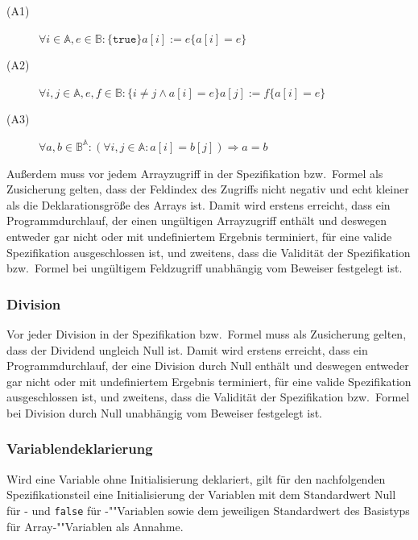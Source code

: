 \begin{description}%
    \item[(A1)] \begin{math}\forall i \in \mathbb{A}, e \in \mathbb{B} : \{\texttt{true}\} a[i] := e \{a[i] = e\}\end{math}%
    \item[(A2)] \begin{math}\forall i, j \in \mathbb{A}, e, f \in \mathbb{B} : \{i \neq j \wedge a[i] = e\} a[j] := f \{a[i] = e\}\end{math}%
    \item[(A3)] \begin{math}\forall a, b \in \mathbb{B}^\mathbb{A} : (\forall i, j \in \mathbb{A} : a[i] = b[j]) \Rightarrow a = b\end{math}%
\end{description}%

Außerdem muss vor jedem Arrayzugriff in der Spezifikation bzw.\ Formel
als Zusicherung gelten, dass der Feldindex des Zugriffs nicht negativ
und echt kleiner als die Deklarationsgröße des Arrays ist. Damit wird
erstens erreicht, dass ein Programmdurchlauf, der einen ungültigen
Arrayzugriff enthält und deswegen entweder gar nicht oder mit
undefiniertem Ergebnis terminiert, für eine valide Spezifikation
ausgeschlossen ist, und zweitens, dass die Validität der Spezifikation
bzw.\ Formel bei ungültigem Feldzugriff unabhängig vom Beweiser
festgelegt ist.%

\subsubsection{Division}%

Vor jeder Division in der Spezifikation bzw.\ Formel muss als
Zusicherung gelten, dass der Dividend ungleich Null ist. Damit wird
erstens erreicht, dass ein Programmdurchlauf, der eine Division durch
Null enthält und deswegen entweder gar nicht oder mit undefiniertem
Ergebnis terminiert, für eine valide Spezifikation ausgeschlossen ist,
und zweitens, dass die Validität der Spezifikation bzw.\ Formel bei
Division durch Null unabhängig vom Beweiser festgelegt ist.%

\subsubsection{Variablendeklarierung}%

Wird eine Variable ohne Initialisierung deklariert, gilt für den
nachfolgenden Spezifikationsteil eine Initialisierung der Variablen
mit dem Standardwert Null für \int- und \texttt{false} für
\bool-""Variablen sowie dem jeweiligen Standardwert des
Basistyps für Array-""Variablen als Annahme.%

